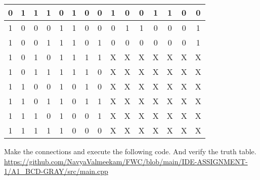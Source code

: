 \documentclass{article}
\begin{document}
\begin{multicols}{2}
\begin{center}
\begin{tableofcontents}
\begin{tabular}{|c|c|c|c|c|c|c|c|c|c|c|c|c|c|c|}
\hline 
0 & 1 & 1 & 1 & 0 & 1 & 0 & 0 & 1 & 0 & 0 & 1 & 1 & 0 & 0 \\
\hline
1 & 0 & 0 & 0 & 1 & 1 & 0 & 0 & 0 & 1 & 1 & 0 & 0 & 0 & 1 \\
\hline
1 & 0 & 0 & 1 & 1 & 1 & 0 & 1 & 0 & 0 & 0 & 0 & 0 & 0 & 1 \\
\hline
1 & 0 & 1 & 0 & 1 & 1 & 1 & 1 & {X} & {X} & {X} & {X} & {X} & {X} & {X}  \\
\hline
1 & 0 & 1 & 1 & 1 & 1 & 1 & 0 & {X} & {X} & {X} & {X} & {X} & {X} & {X}  \\
\hline
1 & 1 & 0 & 0 & 1 & 0 & 1 & 0 & {X} & {X} & {X} & {X} & {X} & {X} & {X} \\
\hline
1 & 1 & 0 & 1 & 1 & 0 & 1 & 1 & {X} & {X} & {X} & {X} & {X} & {X} & {X} \\
\hline
1 & 1 & 1 & 0 & 1 & 0 & 0 & 1 & {X} & {X} & {X} & {X} & {X} & {X} & {X} \\
\hline
1 & 1 & 1 & 1 & 1 & 0 & 0 & 0 & {X} & {X} & {X} & {X} & {X} & {X} & {X}  \\
\hline
\end{tabular}
\end{tableofcontents}
\end{center}
Make the connections and execute the following code. And verify the truth table. 
\newline
\newline
\href{https://github.com/NavyaValmeekam/FWC/blob/main/IDE-ASSIGNMENT-1/A1_BCD-GRAY/src/main.cpp}{https://github.com/NavyaValmeekam/FWC/blob/main/IDE-ASSIGNMENT-1/A1_BCD-GRAY/src/main.cpp}
\maketitle
\newpage
\bigskip
\renewcommand{\thefigure}{\theenumi}
\renewcommand{\thetable}{\theenumi}
%
%



\end{multicols}
\end{document}

